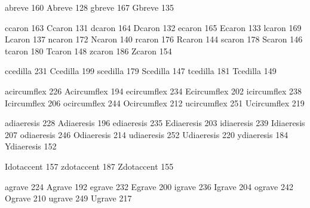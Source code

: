  abreve          160
 Abreve          128
 gbreve          167
 Gbreve          135

 ccaron          163
 Ccaron          131
 dcaron          164
 Dcaron          132
 ecaron          165
 Ecaron          133
 lcaron          169
 Lcaron          137
 ncaron          172
 Ncaron          140
 rcaron          176
 Rcaron          144
 scaron          178
 Scaron          146
 tcaron          180
 Tcaron          148
 zcaron          186
 Zcaron          154

 ccedilla        231
 Ccedilla        199
 scedilla        179
 Scedilla        147
 tcedilla        181
 Tcedilla        149

 acircumflex     226
 Acircumflex     194
 ecircumflex     234
 Ecircumflex     202
 icircumflex     238
 Icircumflex     206
 ocircumflex     244
 Ocircumflex     212
 ucircumflex     251
 Ucircumflex     219

 adiaeresis      228
 Adiaeresis      196
 ediaeresis      235
 Ediaeresis      203
 idiaeresis      239
 Idiaeresis      207
 odiaeresis      246
 Odiaeresis      214
 udiaeresis      252
 Udiaeresis      220
 ydiaeresis      184
 Ydiaeresis      152

 Idotaccent      157
 zdotaccent      187
 Zdotaccent      155

 agrave          224
 Agrave          192
 egrave          232
 Egrave          200
 igrave          236
 Igrave          204
 ograve          242
 Ograve          210
 ugrave          249
 Ugrave          217

